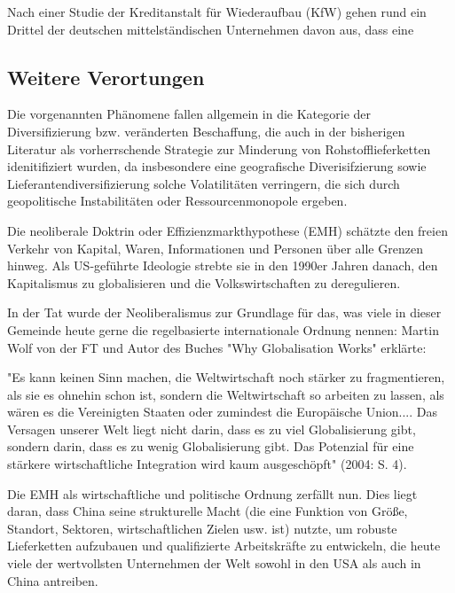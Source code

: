 \documentclass[12pt,a4paper,oneside]{book} %
\begin{document}
{	
	
	
	
	Nach einer Studie der Kreditanstalt für Wiederaufbau (KfW) gehen rund ein Drittel der deutschen mittelständischen Unternehmen davon aus, dass eine 
	
	\subsection{Weitere Verortungen}
	
	
	Die vorgenannten Phänomene fallen allgemein in die Kategorie der Diversifizierung bzw. veränderten Beschaffung, die auch in der bisherigen Literatur als vorherrschende Strategie zur Minderung von Rohstofflieferketten idenitifiziert wurden, da insbesondere eine geografische Diverisifzierung sowie Lieferantendiversifizierung solche Volatilitäten verringern, die sich durch geopolitische Instabilitäten oder Ressourcenmonopole ergeben.\autocite{Resilience of Critical Minerals Supply Chain, S. 11}
	
	Die neoliberale Doktrin oder Effizienzmarkthypothese (EMH) schätzte den freien Verkehr von Kapital, Waren, Informationen und Personen über alle Grenzen hinweg. Als US-geführte Ideologie strebte sie in den 1990er Jahren danach, den Kapitalismus zu globalisieren und die Volkswirtschaften zu deregulieren.
	
	In der Tat wurde der Neoliberalismus zur Grundlage für das, was viele in dieser Gemeinde heute gerne die regelbasierte internationale Ordnung nennen: Martin Wolf von der FT und Autor des Buches "Why Globalisation Works" erklärte:
	
	"Es kann keinen Sinn machen, die Weltwirtschaft noch stärker zu fragmentieren, als sie es ohnehin schon ist, sondern die Weltwirtschaft so arbeiten zu lassen, als wären es die Vereinigten Staaten oder zumindest die Europäische Union.... Das Versagen unserer Welt liegt nicht darin, dass es zu viel Globalisierung gibt, sondern darin, dass es zu wenig Globalisierung gibt. Das Potenzial für eine stärkere wirtschaftliche Integration wird kaum ausgeschöpft" (2004: S. 4).
	
	Die EMH als wirtschaftliche und politische Ordnung zerfällt nun. Dies liegt daran, dass China seine strukturelle Macht (die eine Funktion von Größe, Standort, Sektoren, wirtschaftlichen Zielen usw. ist) nutzte, um robuste Lieferketten aufzubauen und qualifizierte Arbeitskräfte zu entwickeln, die heute viele der wertvollsten Unternehmen der Welt sowohl in den USA als auch in China antreiben.
	
}
\end{document}
